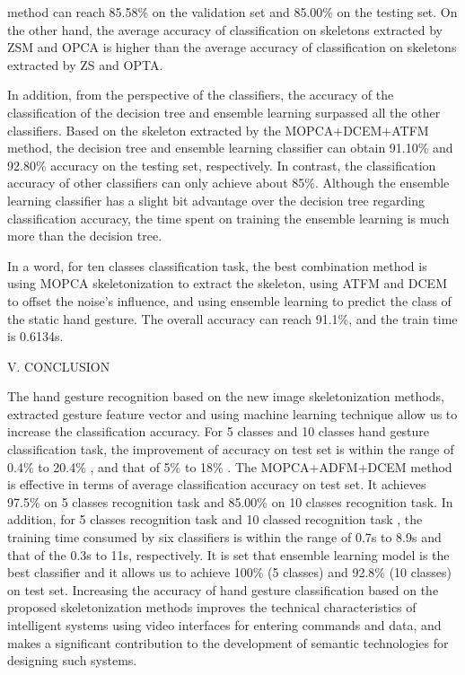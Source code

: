 \documentclass[twocolumn]{article}
\begin{document}
 \noindent method can reach 85.58\% on the validation set and 85.00\% on the testing set. On the other hand, the average accuracy of classification on skeletons extracted by ZSM and OPCA is higher than the average accuracy of classification on skeletons extracted by ZS and OPTA. 
\par In addition, from the perspective of the classifiers, the accuracy of the classification of the decision tree and ensemble learning surpassed all the other classifiers. Based on the skeleton extracted by the MOPCA+DCEM+ATFM method, the decision tree and ensemble learning classifier can obtain 91.10\% and 92.80\% accuracy on the testing set, respectively. In contrast, the classification accuracy of other classifiers can only achieve about 85\%. Although the ensemble learning classifier has a slight bit advantage over the decision tree regarding classification accuracy, the time spent on training the ensemble learning is much more than the decision tree. 
\par In a word, for ten classes classification task, the best combination method is using MOPCA skeletonization to extract the skeleton, using ATFM and DCEM to offset the noise’s influence, and using ensemble learning to predict the class of the static hand gesture. The overall accuracy can reach 91.1\%, and the train time is 0.6134s.
\begin{center}
V. CONCLUSION
\end{center}
\par The hand gesture recognition based on the new image skeletonization methods, extracted gesture feature vector and using machine learning technique allow us to increase the classification accuracy. For 5 classes and 10 classes hand gesture classification task, the improvement of accuracy on test set is within the range of 0.4\% to 20.4\% , and that of 5\% to 18\% . The MOPCA+ADFM+DCEM method is effective in terms of average classification accuracy on test set. It achieves 97.5\% on 5 classes recognition task and 85.00\% on 10 classes recognition task. In addition, for 5 classes recognition task and 10 classed recognition task , the training time consumed by six classifiers is within the range of 0.7s to 8.9s and that of the 0.3s to 11s, respectively. It is set that ensemble learning model is the best classifier and it allows us to achieve 100\% (5 classes) and 92.8\% (10 classes) on test set. Increasing the accuracy of hand gesture classification based on the proposed skeletonization methods improves the technical characteristics of intelligent systems using video interfaces for entering commands and data, and makes a significant contribution to the development of semantic technologies for designing such systems.
\end{document}
